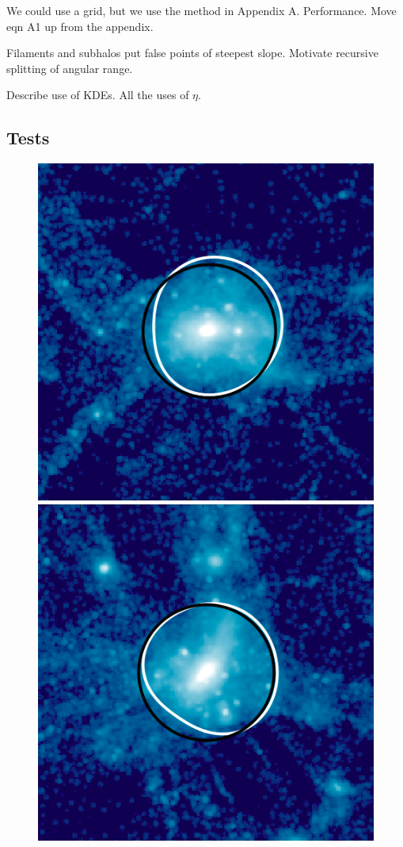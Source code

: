 \documentclass[numberedappendix,apj]{emulateapj}
\begin{document}
We could use a grid, but we use the method in Appendix A. Performance. Move
eqn A1 up from the appendix.

Filaments and subhalos put false points of steepest slope. Motivate recursive
splitting of angular range.

Describe use of KDEs. All the uses of $\eta$.

\subsection{Tests}

\begin{figure}
   \centering
   \includegraphics[width=0.7\columnwidth]{example_halos/pass_ex1.png}
   \hspace{0.4cm}
   \includegraphics[width=0.7\columnwidth]{example_halos/pass_ex2.png}\\

\end{figure}
\end{document}
